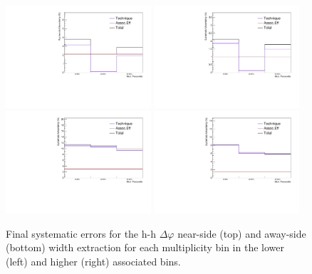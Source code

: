 \begin{figure}[ht]
    \centering
        \includegraphics[width=0.48\textwidth]{figures/analysis/systematics_ns_hh_width_postbarlow_lowpt.pdf}
        \includegraphics[width=0.48\textwidth]{figures/analysis/systematics_ns_hh_width_postbarlow_highpt.pdf}
        \includegraphics[width=0.48\textwidth]{figures/analysis/systematics_as_hh_width_postbarlow_lowpt.pdf}
        \includegraphics[width=0.48\textwidth]{figures/analysis/systematics_as_hh_width_postbarlow_highpt.pdf}
    \caption{Final systematic errors for the h-h $\Delta\varphi$ near-side (top) and away-side (bottom) width extraction for each multiplicity bin in the lower (left) and higher (right) associated \pt bins.}
    \label{fig:h_h_width_systematics_plots}
\end{figure}

